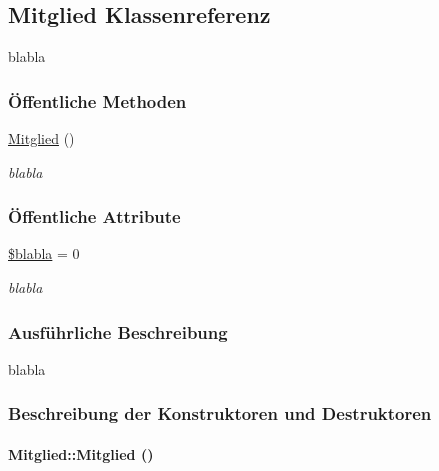 \hypertarget{classMitglied}{
\subsection{Mitglied Klassenreferenz}
\label{classMitglied}
}
blabla  


\subsubsection*{\"{O}ffentliche Methoden}
\begin{CompactItemize}
\item 
\hyperlink{classMitglied_a5e881881d7fa340611898aaea939cb3}{Mitglied} ()
\begin{CompactList}\small\item\em blabla \item\end{CompactList}\end{CompactItemize}
\subsubsection*{\"{O}ffentliche Attribute}
\begin{CompactItemize}
\item 
\hyperlink{classMitglied_8cf2e1dce2c0ae743bdc55af7252f7a7}{\$blabla} = 0
\begin{CompactList}\small\item\em blabla \item\end{CompactList}\end{CompactItemize}


\subsubsection{Ausf\"{u}hrliche Beschreibung}
blabla 



\subsubsection{Beschreibung der Konstruktoren und Destruktoren}
\hypertarget{classMitglied_a5e881881d7fa340611898aaea939cb3}{
\paragraph[Mitglied]{\setlength{\rightskip}{0pt plus 5cm}Mitglied::Mitglied ()}\hfill}
\label{classMitglied_a5e881881d7fa340611898aaea939cb3}



